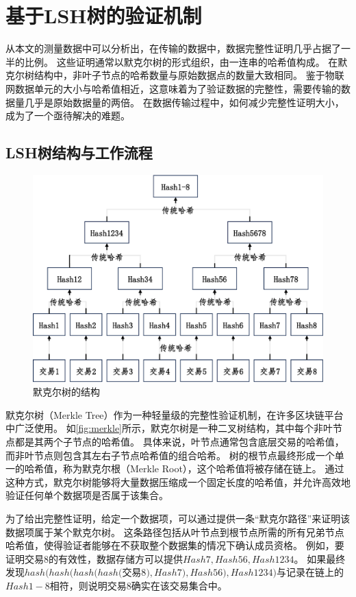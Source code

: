 \cleardoublepage
\chapter{基于LSH树的验证机制}
\label{sec:lsh}
从本文的测量数据中可以分析出，在传输的数据中，数据完整性证明几乎占据了一半的比例。
这些证明通常以默克尔树的形式组织，由一连串的哈希值构成。
在默克尔树结构中，非叶子节点的哈希数量与原始数据点的数量大致相同。
鉴于物联网数据单元的大小与哈希值相近，这意味着为了验证数据的完整性，需要传输的数据量几乎是原始数据量的两倍。
在数据传输过程中，如何减少完整性证明大小，成为了一个亟待解决的难题。

\section{LSH树结构与工作流程}

\begin{figure}[t]
    \centering
    \includegraphics[width=0.85\linewidth]{figures/timechain/merkle.pdf}
    \caption{默克尔树的结构}
    \label{fig:merkle}
\end{figure}

默克尔树（Merkle Tree）作为一种轻量级的完整性验证机制，在许多区块链平台中广泛使用。
如\autoref{fig:merkle}所示，默克尔树是一种二叉树结构，其中每个非叶节点都是其两个子节点的哈希值。
具体来说，叶节点通常包含底层交易的哈希值，而非叶节点则包含其左右子节点哈希值的组合哈希。
树的根节点最终形成一个单一的哈希值，称为默克尔根（Merkle Root），这个哈希值将被存储在链上。
通过这种方式，默克尔树能够将大量数据压缩成一个固定长度的哈希值，并允许高效地验证任何单个数据项是否属于该集合。

为了给出完整性证明，给定一个数据项，可以通过提供一条“默克尔路径”来证明该数据项属于某个默克尔树。
这条路径包括从叶节点到根节点所需的所有兄弟节点哈希值，使得验证者能够在不获取整个数据集的情况下确认成员资格。
例如，要证明交易8的有效性，数据存储方可以提供$Hash7, Hash56, Hash1234$。
如果最终发现$hash(hash(hash(hash($交易8$),Hash7),Hash56),Hash1234)$与记录在链上的$Hash1-8$相符，则说明交易8确实在该交易集合中。

